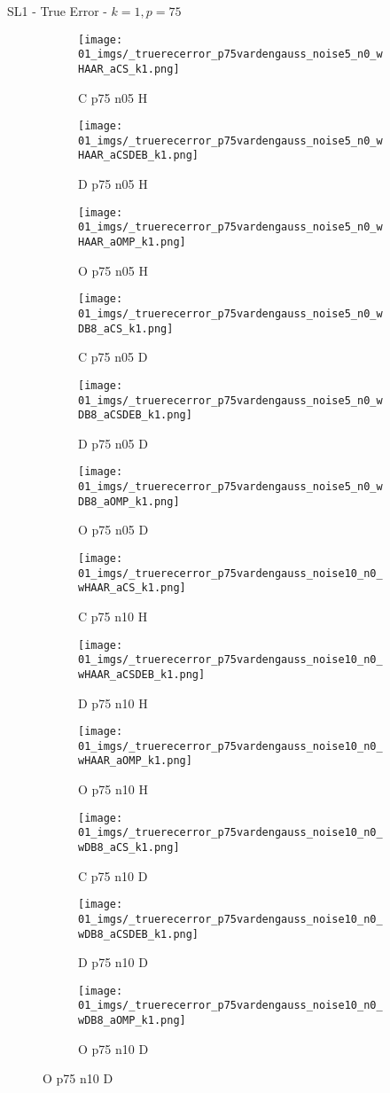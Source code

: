 \begin{frame}{SL1 - True Error - $k=1,p=75$}{}
\begin{figure}
\begin{subfigure}{0.13\textwidth}
\texttt{[image: 01\_imgs/\_truerecerror\_p75vardengauss\_noise5\_n0\_wHAAR\_aCS\_k1.png]}
\caption*{\tiny C p75 n05 H}
\end{subfigure}
\begin{subfigure}{0.13\textwidth}
\texttt{[image: 01\_imgs/\_truerecerror\_p75vardengauss\_noise5\_n0\_wHAAR\_aCSDEB\_k1.png]}
\caption*{\tiny D p75 n05 H}
\end{subfigure}
\begin{subfigure}{0.13\textwidth}
\texttt{[image: 01\_imgs/\_truerecerror\_p75vardengauss\_noise5\_n0\_wHAAR\_aOMP\_k1.png]}
\caption*{\tiny O p75 n05 H}
\end{subfigure}
\begin{subfigure}{0.13\textwidth}
\texttt{[image: 01\_imgs/\_truerecerror\_p75vardengauss\_noise5\_n0\_wDB8\_aCS\_k1.png]}
\caption*{\tiny C p75 n05 D}
\end{subfigure}
\begin{subfigure}{0.13\textwidth}
\texttt{[image: 01\_imgs/\_truerecerror\_p75vardengauss\_noise5\_n0\_wDB8\_aCSDEB\_k1.png]}
\caption*{\tiny D p75 n05 D}
\end{subfigure}
\begin{subfigure}{0.13\textwidth}
\texttt{[image: 01\_imgs/\_truerecerror\_p75vardengauss\_noise5\_n0\_wDB8\_aOMP\_k1.png]}
\caption*{\tiny O p75 n05 D}
\end{subfigure}

\vspace{5pt}

\begin{subfigure}{0.13\textwidth}
\texttt{[image: 01\_imgs/\_truerecerror\_p75vardengauss\_noise10\_n0\_wHAAR\_aCS\_k1.png]}
\caption*{\tiny C p75 n10 H}
\end{subfigure}
\begin{subfigure}{0.13\textwidth}
\texttt{[image: 01\_imgs/\_truerecerror\_p75vardengauss\_noise10\_n0\_wHAAR\_aCSDEB\_k1.png]}
\caption*{\tiny D p75 n10 H}
\end{subfigure}
\begin{subfigure}{0.13\textwidth}
\texttt{[image: 01\_imgs/\_truerecerror\_p75vardengauss\_noise10\_n0\_wHAAR\_aOMP\_k1.png]}
\caption*{\tiny O p75 n10 H}
\end{subfigure}
\begin{subfigure}{0.13\textwidth}
\texttt{[image: 01\_imgs/\_truerecerror\_p75vardengauss\_noise10\_n0\_wDB8\_aCS\_k1.png]}
\caption*{\tiny C p75 n10 D}
\end{subfigure}
\begin{subfigure}{0.13\textwidth}
\texttt{[image: 01\_imgs/\_truerecerror\_p75vardengauss\_noise10\_n0\_wDB8\_aCSDEB\_k1.png]}
\caption*{\tiny D p75 n10 D}
\end{subfigure}
\begin{subfigure}{0.13\textwidth}
\texttt{[image: 01\_imgs/\_truerecerror\_p75vardengauss\_noise10\_n0\_wDB8\_aOMP\_k1.png]}
\caption*{\tiny O p75 n10 D}
\end{subfigure}


\end{figure}
\end{frame}

